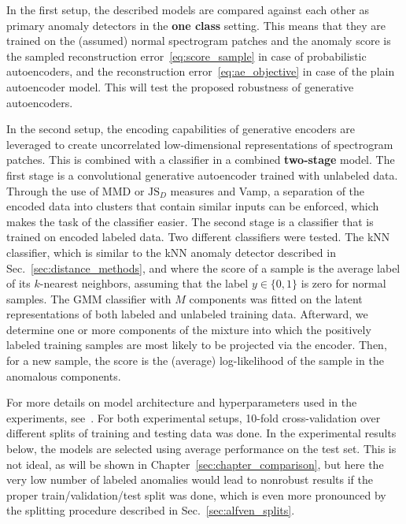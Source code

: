 In the first setup, the described models are compared against each other as primary anomaly detectors in the \textbf{one class} setting. This means that they are trained on the (assumed) normal spectrogram patches and the anomaly score is the sampled reconstruction error~\eqref{eq:score_sample} in case of probabilistic autoencoders, and the reconstruction error~\eqref{eq:ae_objective} in case of the plain autoencoder model. This will test the proposed robustness of generative autoencoders.

In the second setup, the encoding capabilities of generative encoders are leveraged to create uncorrelated low-dimensional representations of spectrogram patches. This is combined with a classifier in a combined \textbf{two-stage} model. The first stage is a convolutional generative autoencoder trained with unlabeled data. Through the use of MMD or $\text{JS}_D$ measures and Vamp, a separation of the encoded data into clusters that contain similar inputs can be enforced, which makes the task of the classifier easier. The second stage is a classifier that is trained on encoded labeled data. Two different classifiers were tested. The kNN classifier, which is similar to the kNN anomaly detector described in Sec.~\ref{sec:distance_methods}, and where the score of a sample is the average label of its $k$-nearest neighbors, assuming that the label $y \in \lbrace 0,1 \rbrace$ is zero for normal samples. The GMM classifier with $M$ components was fitted on the latent representations of both labeled and unlabeled training data. Afterward, we determine one or more components of the mixture into which the positively labeled training samples are most likely to be projected via the encoder. Then, for a new sample, the score is the (average) log-likelihood of the sample in the anomalous components. 

For more details on model architecture and hyperparameters used in the experiments, see~\cite{vskvara2020detection}. For both experimental setups, 10-fold cross-validation over different splits of training and testing data was done. In the experimental results below, the models are selected using average performance on the test set. This is not ideal, as will be shown in Chapter~\ref{sec:chapter_comparison}, but here the very low number of labeled anomalies would lead to nonrobust results if the proper train/validation/test split was done, which is even more pronounced by the splitting procedure described in Sec.~\ref{sec:alfven_splits}.

